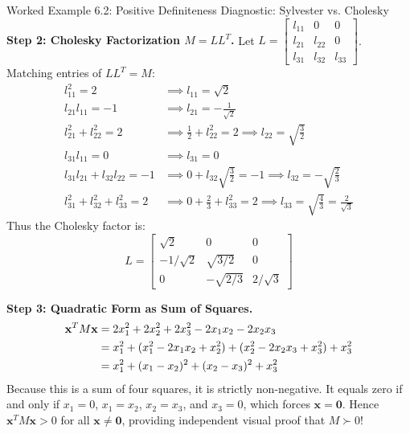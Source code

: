\begin{examplebox}[breakable]{Worked Example 6.2: Positive Definiteness Diagnostic: Sylvester vs. Cholesky}
\textbf{Step 2: Cholesky Factorization $M = L L^T$.}
Let $L = \begin{bmatrix} l_{11} & 0 & 0 \\ l_{21} & l_{22} & 0 \\ l_{31} & l_{32} & l_{33} \end{bmatrix}$. Matching entries of $L L^T = M$:
\begin{align}
l_{11}^2 = 2 &\implies l_{11} = \sqrt{2} \\
l_{21} l_{11} = -1 &\implies l_{21} = -\frac{1}{\sqrt{2}} \\
l_{21}^2 + l_{22}^2 = 2 &\implies \frac{1}{2} + l_{22}^2 = 2 \implies l_{22} = \sqrt{\frac{3}{2}} \\
l_{31} l_{11} = 0 &\implies l_{31} = 0 \\
l_{31} l_{21} + l_{32} l_{22} = -1 &\implies 0 + l_{32}\sqrt{\frac{3}{2}} = -1 \implies l_{32} = -\sqrt{\frac{2}{3}} \\
l_{31}^2 + l_{32}^2 + l_{33}^2 = 2 &\implies 0 + \frac{2}{3} + l_{33}^2 = 2 \implies l_{33} = \sqrt{\frac{4}{3}} = \frac{2}{\sqrt{3}}
\end{align}
Thus the Cholesky factor is:
\begin{equation}
L = \begin{bmatrix} \sqrt{2} & 0 & 0 \\ -1/\sqrt{2} & \sqrt{3/2} & 0 \\ 0 & -\sqrt{2/3} & 2/\sqrt{3} \end{bmatrix}
\end{equation}

\textbf{Step 3: Quadratic Form as Sum of Squares.}
\begin{align}
\mathbf{x}^T M \mathbf{x} &= 2x_1^2 + 2x_2^2 + 2x_3^2 - 2x_1 x_2 - 2x_2 x_3 \notag \\
&= x_1^2 + (x_1^2 - 2x_1 x_2 + x_2^2) + (x_2^2 - 2x_2 x_3 + x_3^2) + x_3^2 \notag \\
&= x_1^2 + (x_1 - x_2)^2 + (x_2 - x_3)^2 + x_3^2
\end{align}
Because this is a sum of four squares, it is strictly non-negative. It equals zero if and only if $x_1 = 0$, $x_1 = x_2$, $x_2 = x_3$, and $x_3 = 0$, which forces $\mathbf{x} = \mathbf{0}$. 
Hence $\mathbf{x}^T M \mathbf{x} > 0$ for all $\mathbf{x} \ne \mathbf{0}$, providing independent visual proof that $M \succ 0$!
\end{examplebox}

